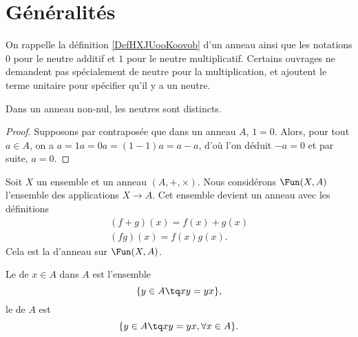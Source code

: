 
\section{Généralités}

On rappelle la définition \ref{DefHXJUooKoovob} d'un anneau ainsi que les notations $0$ pour le neutre additif et $1$ pour le neutre multiplicatif. Certains ouvrages ne demandent pas spécialement de neutre pour la multiplication, et ajoutent le terme unitaire pour spécifier qu'il y a un neutre.

\begin{proposition}
    Dans un anneau non-nul, les neutres sont distincts.
\end{proposition}
\begin{proof}
    Supposons par contraposée que dans un anneau $A$, \( 1 = 0 \). Alors, pour tout \( a \in A \), on a \( a = 1a = 0a = (1 - 1)a = a - a \), d'où l'on déduit \( -a = 0  \) et par suite, \( a = 0. \)
\end{proof}

Soit \( X\) un ensemble et un anneau $(A, +, \times)$. Nous considérons \( \Fun(X,A)\) l'ensemble des applications \( X\to A\). Cet ensemble devient un anneau avec les définitions
\begin{subequations}
    \begin{align}
        (f+g)(x)=f(x)+g(x)\\
        (fg)(x)=f(x)g(x).
    \end{align}
\end{subequations}
Cela est la  d'anneau sur \( \Fun(X,A)\).

Le  de \( x\in A\) dans \( A\) est l'ensemble
\begin{equation}
    \{ y\in A\tq xy=yx \},
\end{equation}
le  de \( A\) est
\begin{equation}
    \{ y\in A\tq xy=yx,\forall x\in A \}.
\end{equation}

